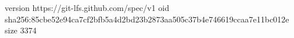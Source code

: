 version https://git-lfs.github.com/spec/v1
oid sha256:85cbe52e94ca7cf2bfb5a4d2bd23b2873aa505c37b4e746619ccaa7e11bc012e
size 3374
